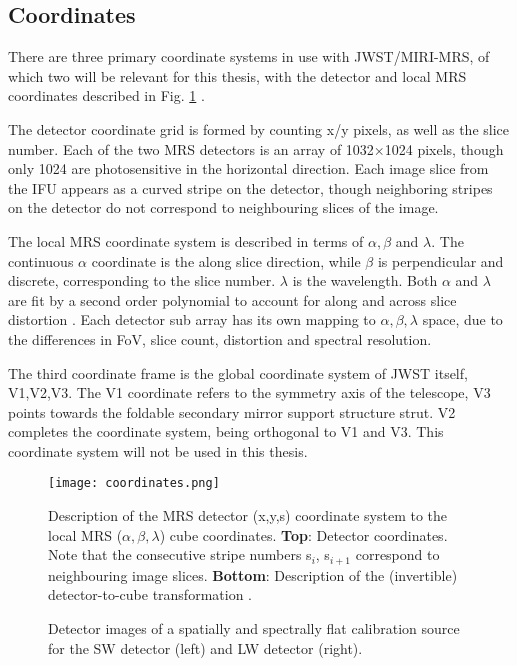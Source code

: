 \subsection{Coordinates}
There are three primary coordinate systems in use with JWST/MIRI-MRS, of which two will be relevant for this thesis, with the detector and local MRS coordinates described in Fig. \ref{fig:mrscoords} \parencite{Argyriou2020}.

The detector coordinate grid is formed by counting x/y pixels, as well as the slice number.
Each of the two MRS detectors is an array of 1032$\times$1024 pixels, though only 1024 are photosensitive in the horizontal direction.
Each image slice from the IFU appears as a curved stripe on the detector, though neighboring stripes on the detector do not correspond to neighbouring slices of the image. 

The local MRS coordinate system is described in terms of $\alpha,\beta$ and $\lambda$. The continuous $\alpha$ coordinate is the along slice direction, while $\beta$ is perpendicular and discrete, corresponding to the slice number. $\lambda$ is the wavelength. Both $\alpha$ and $\lambda$ are fit by a second order polynomial to account for along and across slice distortion \parencite{MIRI6}. Each detector sub array has its own mapping to $\alpha,\beta,\lambda$ space, due to the differences in FoV, slice count, distortion and spectral resolution.

The third coordinate frame is the global coordinate system of JWST itself, V1,V2,V3. The V1 coordinate refers to the symmetry axis of the telescope, V3 points towards the foldable secondary mirror support structure strut. V2 completes the coordinate system, being orthogonal to V1 and V3. This coordinate system will not be used in this thesis.

\begin{figure}[t]
	\texttt{[image: coordinates.png]}
	\caption{Description of the MRS detector (x,y,s) coordinate system to the local MRS ($\alpha,\beta,\lambda$) cube coordinates. \textbf{Top}: Detector coordinates. Note that the consecutive stripe numbers s$_{i}$, s$_{i+1}$ correspond to neighbouring image slices. \textbf{Bottom}: Description of the (invertible) detector-to-cube transformation \parencite{Argyriou2020}.}
	\label{fig:mrscoords}	
\end{figure}

\begin{figure}[t]
	\caption{Detector images of a spatially and spectrally flat calibration source for the SW detector (left) and LW detector (right).}
	\label{fig:flatfield}
\end{figure}

